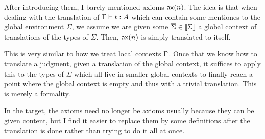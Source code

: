 After introducing them, I barely mentioned axioms \(\mathsf{ax}(n)\).
The idea is that when dealing with the translation of \(\Gamma \vdash t : A\)
which can contain some mentiones to the global environment \(\Sigma\),
we assume we are given some \(\overline{\Sigma} \in \llbracket \Sigma \rrbracket\)
a global context of translations of the types of \(\Sigma\).
Then, \(\mathsf{ax}(n)\) is simply translated to itself.

This is very similar to how we treat local contexts \(\Gamma\).
Once that we know how to translate a judgment, given a translation of the
global context, it suffices to apply this to the types of \(\Sigma\) which all
live in smaller global contexts to finally reach a point where the global
context is empty and thus with a trivial translation.
This is merely a formality.

In the target, the axioms need no longer be axioms usually because they can be
given content, but I find it easier to replace them by some definitions after
the translation is done rather than trying to do it all at once.